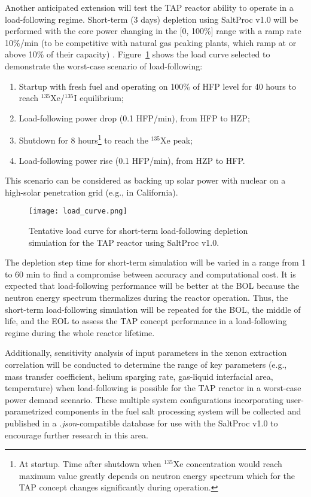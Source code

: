 Another anticipated extension will test the \gls{TAP} reactor ability to 
operate in a load-following regime. Short-term (3 days) depletion using 
SaltProc v1.0 will be performed with the core power changing in the [0, 100\%] 
range with a ramp rate 10\%/min (to be competitive with natural gas peaking 
plants, which ramp at or above 10\% of their capacity) 
\cite{huff_enabling_2018}. 
Figure~\ref{fig:load} shows the load curve selected to demonstrate the 
worst-case scenario of load-following:
\begin{enumerate}
	\item Startup with fresh fuel and operating on 100\% of \gls{HFP}
level 
	for 40 hours to reach $^{135}$Xe/$^{135}$I equilibrium;
	\item Load-following power drop (0.1 \gls{HFP}/min), from \gls{HFP} 
	to \gls{HZP};
	\item Shutdown for 8 hours\footnote{At startup. Time after shutdown when 
	$^{135}$Xe concentration would reach maximum value greatly depends on 
	neutron energy spectrum which for the \gls{TAP} concept changes 
	significantly during operation.} to reach the $^{135}$Xe peak;
	\item Load-following power rise (0.1 \gls{HFP}/min), from \gls{HZP} 
	to \gls{HFP}.
\end{enumerate}
This scenario can be considered as backing up solar power with
nuclear on a 
high-solar penetration grid (e.g., in California).
\begin{figure}[bth!] %
	\centering
	\texttt{[image: load\_curve.png]}
	\caption{Tentative load curve for short-term load-following depletion 
	simulation for the \gls{TAP} reactor using SaltProc v1.0.}
	\label{fig:load}
\end{figure}

The depletion step time for short-term simulation will be varied in a range 
from 1 to 60 min to find a compromise between accuracy and computational cost. 
It is expected that load-following performance will be better at the \gls{BOL} 
because the neutron energy spectrum thermalizes during the reactor operation. 
Thus, the short-term load-following simulation will be repeated for the 
\gls{BOL}, the middle of life, and the \gls{EOL} to assess the \gls{TAP} 
concept performance in a load-following regime during the whole reactor 
lifetime.

Additionally, sensitivity analysis of input parameters in the xenon extraction 
correlation will be conducted to determine the range of key parameters (e.g., 
mass transfer coefficient, helium sparging rate, gas-liquid interfacial area, 
temperature) when load-following is possible for the \gls{TAP} reactor in a 
worst-case power demand scenario. These multiple system configurations  
incorporating user-parametrized components in the fuel salt processing system 
will be collected and published in a \textit{.json}-compatible database for 
use with the SaltProc v1.0 to encourage further research in this area.

